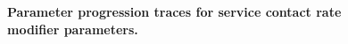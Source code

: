 \begin{figure}[ht]
    \caption{\textbf{Parameter progression traces for service contact rate modifier parameters.}}
\end{figure}

